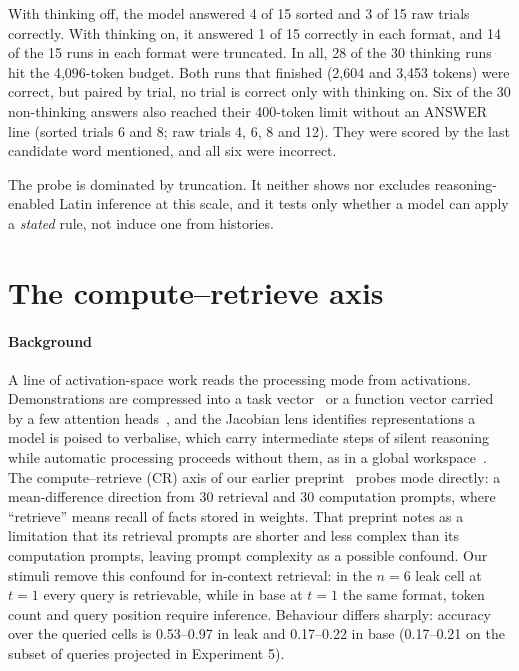 \documentclass[11pt]{article}
\begin{document}
With thinking off, the model answered 4 of 15 sorted and 3 of 15 raw trials correctly. With thinking on, it answered 1 of 15 correctly in each format, and 14 of the 15 runs in each format were truncated. In all, 28 of the 30 thinking runs hit the 4,096-token budget. Both runs that finished (2,604 and 3,453 tokens) were correct, but paired by trial, no trial is correct only with thinking on. Six of the 30 non-thinking answers also reached their 400-token limit without an ANSWER line (sorted trials 6 and 8; raw trials 4, 6, 8 and 12). They were scored by the last candidate word mentioned, and all six were incorrect.

The probe is dominated by truncation. It neither shows nor excludes reasoning-enabled Latin inference at this scale, and it tests only whether a model can apply a \emph{stated} rule, not induce one from histories.

\section{The compute--retrieve axis}\label{app:cr}

\paragraph{Background}

A line of activation-space work reads the processing mode from activations. Demonstrations are compressed into a task vector~\cite{hendel2023} or a function vector carried by a few attention heads~\cite{todd2023fv}, and the Jacobian lens identifies representations a model is poised to verbalise, which carry intermediate steps of silent reasoning while automatic processing proceeds without them, as in a global workspace~\cite{gurnee2026workspace}. The compute--retrieve (CR) axis of our earlier preprint~\cite{ramdan2026cr} probes mode directly: a mean-difference direction from 30 retrieval and 30 computation prompts, where ``retrieve'' means recall of facts stored in weights. That preprint notes as a limitation that its retrieval prompts are shorter and less complex than its computation prompts, leaving prompt complexity as a possible confound. Our stimuli remove this confound for in-context retrieval: in the $n = 6$ leak cell at $t = 1$ every query is retrievable, while in base at $t = 1$ the same format, token count and query position require inference. Behaviour differs sharply: accuracy over the queried cells is 0.53--0.97 in leak and 0.17--0.22 in base (0.17--0.21 on the subset of queries projected in Experiment 5).
\end{document}
